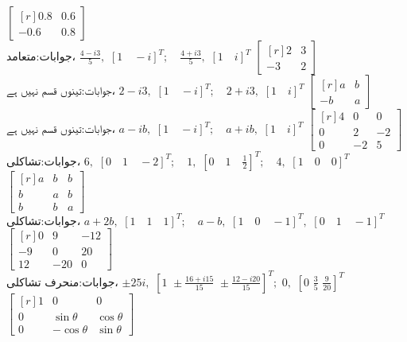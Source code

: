 \quad
$\begin{bmatrix*}[r] 0.8&0.6\\-0.6&0.8 \end{bmatrix*}$\\
جوابات:متعامد،
$\tfrac{4-i3}{5}, \,\, [1\quad-i]^T; \quad \tfrac{4+i3}{5},\,\, [1\quad i]^T$
\quad
$\begin{bmatrix*}[r] 2&3\\-3&2 \end{bmatrix*}$\\
جوابات:تینوں قسم نہیں ہے، 
$2-i3,\,\, [1\quad -i]^T; \quad 2+i3,\,\,[1\quad i]^T$
\quad
$\begin{bmatrix*}[r] a&b\\-b&a \end{bmatrix*}$\\
جوابات:تینوں قسم نہیں ہے، 
$a-ib,\,\,[1\quad -i]^T;\quad a+ib,\,\,[1\quad i]^T$
\quad
$\begin{bmatrix*}[r] 4&0&0\\0&2&-2\\ 0&-2&5 \end{bmatrix*}$\\
جوابات:تشاکلی، 
$6,\,\,[0\quad 1\quad -2]^T;\quad 1,\,\,[0\quad 1\quad \tfrac{1}{2}]^T;\quad 4,\,\,[1\quad 0\quad 0]^T$
\quad
$\begin{bmatrix*}[r] a&b&b\\b&a&b\\b&b&a \end{bmatrix*}$\\
جوابات:تشاکلی، 
$a+2b,\,\,[1\quad 1\quad 1]^T;\quad a-b,\,\,[1\quad 0\quad-1]^T,\,\,[0\quad 1\quad -1]^T$
\quad
$\begin{bmatrix*}[r] 0&9&-12\\-9&0&20\\12&-20&0 \end{bmatrix*}$\\
جوابات:منحرف تشاکلی، 
$\pm 25i,\,\,[1\,\,\pm\tfrac{16+i15}{15}\,\, \pm\tfrac{12-i20}{15}]^T;\,\, 0,\,\,[0\,\, \tfrac{3}{5}\,\, \tfrac{9}{20}]^T$
\quad
$\begin{bmatrix*}[r] 1&0&0\\0&\sin \theta&\cos \theta\\ 0 &-\cos \theta&\sin \theta \end{bmatrix*}$\\
